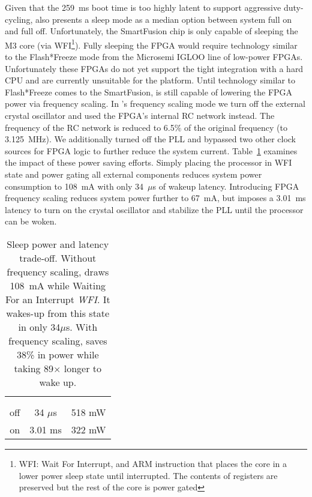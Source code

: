 Given that the 259~ms boot time is too highly latent to support aggressive
duty-cycling, \sdr also presents a sleep mode as a median option between
system full on and full off. Unfortunately, the SmartFusion chip is only
capable of sleeping the M3 core (via WFI\footnote{WFI: Wait For Interrupt, and
ARM instruction that places the core in a lower power sleep state until
interrupted. The contents of registers are preserved but the rest of the core
is power gated}). Fully sleeping the FPGA would require technology similar to
the Flash*Freeze mode from the Microsemi IGLOO line of low-power FPGAs.
Unfortunately these FPGAs do not yet support the tight integration with a hard
CPU and are currently unsuitable for the \sdr platform. Until technology
similar to Flash*Freeze comes to the SmartFusion, \sdr is still capable of
lowering the FPGA power via frequency scaling. In \sdr's frequency scaling
mode we turn off the external crystal oscillator and used the FPGA's internal
RC network instead. The frequency of the RC network is reduced to 6.5\% of
the original frequency (to 3.125~MHz). We additionally turned off the PLL and
bypassed two other clock sources for FPGA logic to further reduce the system
current. Table~\ref{tab:sdr_wfi_duty_cycle} examines the impact of these power
saving efforts. Simply placing the processor in WFI state and power gating all
external components reduces system power consumption to 108~mA with only
34~$\mu$s of wakeup latency. Introducing FPGA frequency scaling reduces
system power further to 67~mA, but imposes a 3.01~ms latency to turn on the
crystal oscillator and stabilize the PLL until the processor can be woken.

\begin{table}[h]
	\centering
	\begin{tabular}{ | c | c | c | }
		\hline
		\rowcolor[gray]{0}
		  {\sc {\color{white} Frequency}}
		& {\sc {\color{white} Wake-up}}
		& {\sc {\color{white} System}}
		\\
		\rowcolor[gray]{0}
		  {\sc {\color{white} Scaling}}
		& {\sc {\color{white} Latency}}
		& {\sc {\color{white} Power}}
		\\ \hline
		off	& 34 $\mu$s	& 518 mW \\	\hline
		on	& 3.01 ms	& 322 mW \\	\hline
	\end{tabular}
    \caption{Sleep power and latency trade-off.  Without frequency scaling,
\sdr draws 108~mA while Waiting For an Interrupt {\em WFI}. It wakes-up from
this state in only 34$\mu$s. With frequency scaling, \sdr saves 38\% in power
while taking 89$\times$ longer to wake up.}
	\label{tab:sdr_wfi_duty_cycle}
\end{table}

